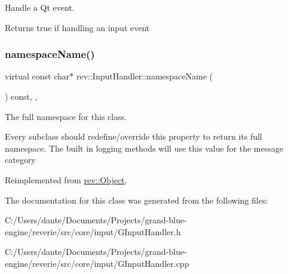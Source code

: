 Handle a Qt event. 

Returns true if handling an input event \mbox{\label{classrev_1_1_input_handler_a99cee0c8e7aff8670751090873ad494b}} 
\subsubsection{\texorpdfstring{namespaceName()}{namespaceName()}}
{\footnotesize\ttfamily virtual const char$\ast$ rev\+::\+Input\+Handler\+::namespace\+Name (\begin{DoxyParamCaption}{ }\end{DoxyParamCaption}) const\hspace{0.3cm}{\ttfamily [inline]}, {\ttfamily [override]}, {\ttfamily [virtual]}}



The full namespace for this class. 

Every subclass should redefine/override this property to return its full namespace. The built in logging methods will use this value for the message category 

Reimplemented from \mbox{\hyperlink{classrev_1_1_object_aaeb638d3e10f361c56c211a318a27f3d}{rev\+::\+Object}}.



The documentation for this class was generated from the following files\+:\begin{DoxyCompactItemize}
\item 
C\+:/\+Users/dante/\+Documents/\+Projects/grand-\/blue-\/engine/reverie/src/core/input/G\+Input\+Handler.\+h\item 
C\+:/\+Users/dante/\+Documents/\+Projects/grand-\/blue-\/engine/reverie/src/core/input/G\+Input\+Handler.\+cpp\end{DoxyCompactItemize}

